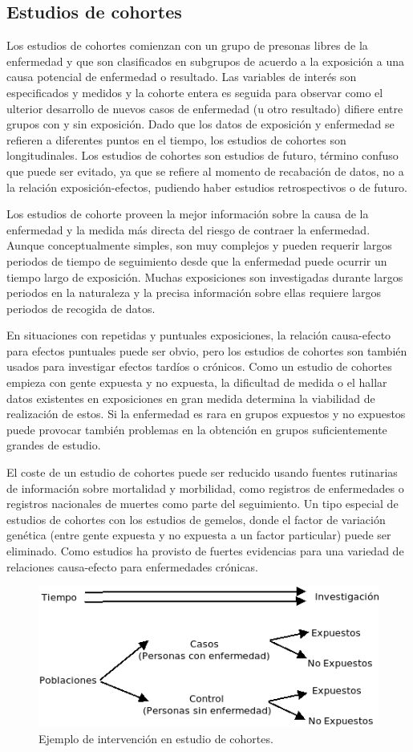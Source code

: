 \subsection{Estudios de cohortes}
Los estudios de cohortes comienzan con un grupo de presonas libres de la enfermedad y que son clasificados en subgrupos de acuerdo a la exposición a una causa potencial de enfermedad o resultado. Las variables de interés son especificados y medidos y la cohorte entera es seguida para observar como el ulterior desarrollo de nuevos casos de enfermedad (u otro resultado) difiere entre grupos con y sin exposición. Dado que los datos de exposición y enfermedad se refieren a diferentes puntos en el tiempo, los estudios de cohortes son longitudinales. Los estudios de cohortes son estudios de futuro, término confuso que puede ser evitado, ya que se refiere al momento de recabación de datos, no a la relación exposición-efectos, pudiendo haber estudios retrospectivos o de futuro.

Los estudios de cohorte proveen la mejor información sobre la causa de la enfermedad y la medida más directa del riesgo de contraer la enfermedad. Aunque conceptualmente simples, son muy complejos y pueden requerir largos periodos de tiempo de seguimiento desde que la enfermedad puede ocurrir un tiempo largo de exposición. Muchas exposiciones son investigadas durante largos periodos en la naturaleza y la precisa información sobre ellas requiere largos periodos de recogida de datos.

En situaciones con repetidas y puntuales exposiciones, la relación causa-efecto para efectos puntuales puede ser obvio, pero los estudios de cohortes son también usados para investigar efectos tardíos o crónicos. Como un estudio de cohortes empieza con gente expuesta y no expuesta, la dificultad de medida o el hallar datos existentes en exposiciones en gran medida determina la viabilidad de realización de estos. Si la enfermedad es rara en grupos expuestos y no expuestos puede provocar también problemas en la obtención en grupos suficientemente grandes de estudio.

El coste de un estudio de cohortes puede ser reducido usando fuentes rutinarias de información sobre mortalidad y morbilidad, como registros de enfermedades o registros nacionales de muertes como parte del seguimiento. Un tipo especial de estudios de cohortes con los estudios de gemelos, donde el factor de variación genética (entre gente expuesta y no expuesta a un factor particular) puede ser eliminado. Como estudios ha provisto de fuertes evidencias para una variedad de relaciones causa-efecto para enfermedades crónicas.
\begin{figure}[H]
	\centering
	\includegraphics[width=0.5\columnwidth]{A.imagenes/ACV-EPI-Cohortes}
	\caption{Ejemplo de intervención en estudio de cohortes.}
\end{figure}
